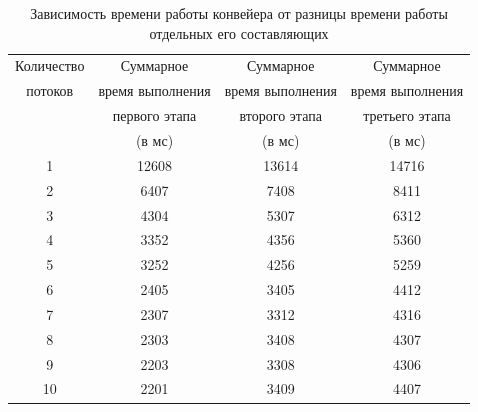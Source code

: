 \documentclass[a4paper, 14pt]{article}
\begin{document}
    \newpage
    \begin{table}[h!]
        \caption{Зависимость времени работы конвейера от разницы времени работы отдельных его составляющих}
            \begin{tabular}{ | c | c | c | c | }
                \hline
                 Количество   &  Суммарное  & Суммарное  & Суммарное \\
                 потоков   &   время выполнения & время выполнения&  время выполнения\\
                    &  первого этапа   &  второго этапа  & третьего этапа \\ 
                  & (в мс) & (в мс) & (в мс)  \\ 
                 \hline  
                1 & 12608& 13614 & 14716 \\
                2 & 6407 & 7408  & 8411  \\
                3 & 4304 & 5307  & 6312  \\
                4 & 3352 & 4356  & 5360  \\
                5 & 3252 & 4256  & 5259  \\
                6 & 2405 & 3405  & 4412  \\
                7 & 2307 & 3312  & 4316  \\
                8 & 2303 & 3408  & 4307  \\
                9 & 2203 & 3308  & 4306  \\
                10& 2201 & 3409  & 4407  \\
                \hline
            \end{tabular}
        \label{tab:threads}
    \end{table} 
    
\end{document}
